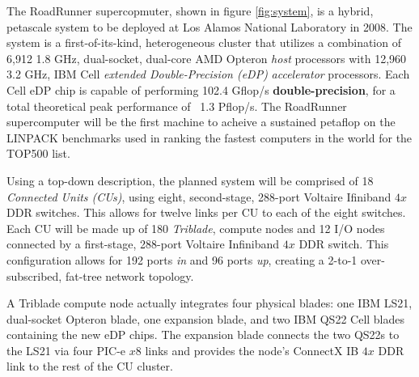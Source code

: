 \documentclass[letter,10pt]{article}
\newcommand{\note}[1]{\marginpar{\small{\color{red} #1}}}
\begin{document}
The RoadRunner supercopmuter, shown in figure \ref{fig:system}, is a hybrid, petascale system to be deployed at Los Alamos National Laboratory in 2008.  The system is a first-of-its-kind, heterogeneous cluster that utilizes a combination of 6,912 1.8 GHz, dual-socket, dual-core AMD Opteron \emph{host} processors with 12,960 3.2 GHz, IBM Cell \emph{extended Double-Precision (eDP)} \emph{accelerator} processors.  Each Cell eDP chip is capable of performing 102.4 Gflop/s \textbf{double-precision}, for a total theoretical peak performance of ~1.3 Pflop/s.  The RoadRunner supercomputer will be the first machine to acheive a sustained petaflop on the LINPACK benchmarks used in ranking the fastest computers in the world for the TOP500 list.\note{add TOP500 citation}

Using a top-down description, the planned system will be comprised of 18 \emph{Connected Units (CUs)}, using eight, second-stage, 288-port Voltaire Ifiniband $4x$ DDR switches.  This allows for twelve links per CU to each of the eight switches.  Each CU will be made up of 180 \emph{Triblade}, compute nodes and 12 I/O nodes connected by a first-stage, 288-port Voltaire Infiniband $4x$ DDR switch.  This configuration allows for 192 ports \emph{in} and 96 ports \emph{up}, creating a 2-to-1 over-subscribed, fat-tree network topology.

A Triblade compute node actually integrates four physical blades: one IBM LS21, dual-socket Opteron blade, one expansion blade, and two IBM QS22 Cell blades containing the new eDP chips.  The expansion blade connects the two QS22s to the LS21 via four PIC-e $x8$ links and provides the node's ConnectX IB $4x$ DDR link to the rest of the CU cluster.




\end{document}
